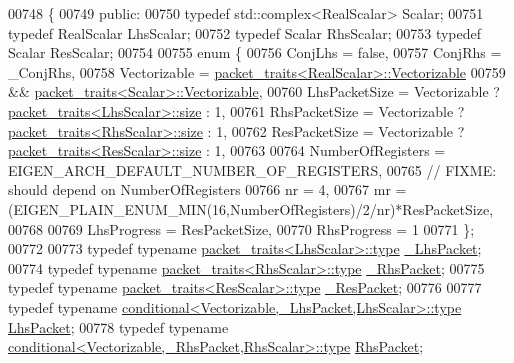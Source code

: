 \begin{DoxyCode}
00748 \{
00749 \textcolor{keyword}{public}:
00750   \textcolor{keyword}{typedef} std::complex<RealScalar>  Scalar;
00751   \textcolor{keyword}{typedef} RealScalar  LhsScalar;
00752   \textcolor{keyword}{typedef} Scalar      RhsScalar;
00753   \textcolor{keyword}{typedef} Scalar      ResScalar;
00754 
00755   \textcolor{keyword}{enum} \{
00756     ConjLhs = \textcolor{keyword}{false},
00757     ConjRhs = \_ConjRhs,
00758     Vectorizable = \hyperlink{struct_eigen_1_1internal_1_1packet__traits}{packet\_traits<RealScalar>::Vectorizable}
00759                 && \hyperlink{struct_eigen_1_1internal_1_1packet__traits}{packet\_traits<Scalar>::Vectorizable},
00760     LhsPacketSize = Vectorizable ? \hyperlink{struct_eigen_1_1internal_1_1packet__traits}{packet\_traits<LhsScalar>::size} : 1,
00761     RhsPacketSize = Vectorizable ? \hyperlink{struct_eigen_1_1internal_1_1packet__traits}{packet\_traits<RhsScalar>::size} : 1,
00762     ResPacketSize = Vectorizable ? \hyperlink{struct_eigen_1_1internal_1_1packet__traits}{packet\_traits<ResScalar>::size} : 1,
00763     
00764     NumberOfRegisters = EIGEN\_ARCH\_DEFAULT\_NUMBER\_OF\_REGISTERS,
00765     \textcolor{comment}{// FIXME: should depend on NumberOfRegisters}
00766     nr = 4,
00767     mr = (EIGEN\_PLAIN\_ENUM\_MIN(16,NumberOfRegisters)/2/nr)*ResPacketSize,
00768 
00769     LhsProgress = ResPacketSize,
00770     RhsProgress = 1
00771   \};
00772 
00773   \textcolor{keyword}{typedef} \textcolor{keyword}{typename} \hyperlink{group___sparse_core___module}{packet\_traits<LhsScalar>::type}  
      \hyperlink{group___sparse_core___module}{\_LhsPacket};
00774   \textcolor{keyword}{typedef} \textcolor{keyword}{typename} \hyperlink{group___sparse_core___module}{packet\_traits<RhsScalar>::type}  
      \hyperlink{group___sparse_core___module}{\_RhsPacket};
00775   \textcolor{keyword}{typedef} \textcolor{keyword}{typename} \hyperlink{group___sparse_core___module}{packet\_traits<ResScalar>::type}  
      \hyperlink{group___sparse_core___module}{\_ResPacket};
00776 
00777   \textcolor{keyword}{typedef} \textcolor{keyword}{typename} \hyperlink{class_eigen_1_1internal_1_1_tensor_lazy_evaluator_writable}{conditional<Vectorizable,\_LhsPacket,LhsScalar>::type}
       \hyperlink{class_eigen_1_1internal_1_1_tensor_lazy_evaluator_writable}{LhsPacket};
00778   \textcolor{keyword}{typedef} \textcolor{keyword}{typename} \hyperlink{class_eigen_1_1internal_1_1_tensor_lazy_evaluator_writable}{conditional<Vectorizable,\_RhsPacket,RhsScalar>::type}
       \hyperlink{class_eigen_1_1internal_1_1_tensor_lazy_evaluator_writable}{RhsPacket};

\end{DoxyCode}
